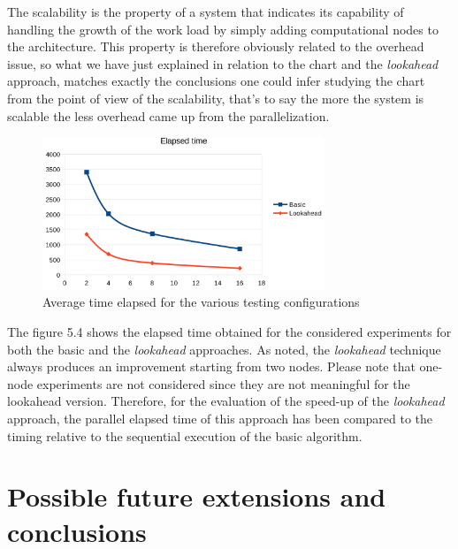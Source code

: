\documentclass[12pt,a4paper,fleqn]{report}
\begin{document}
The scalability is the property of a system that indicates its capability of 
handling the growth of the work load by simply adding computational nodes to the architecture. 
This property is therefore obviously related to the overhead issue, so what we have just 
explained in relation to the chart and the \textit{lookahead} approach, matches exactly the 
conclusions one could infer studying the chart from the point of view of the scalability, that's 
to say the more the system is scalable the less overhead came up from the parallelization.   \\

 \begin{figure}[ht!]
\label{chart1}
\centering
	\vspace{13pt}
    \includegraphics[trim=0mm 10mm 0mm 10mm, width=0.75\textwidth]{time_elapsed}
    \caption{Average time elapsed for the various testing configurations}
\end{figure}

The figure 5.4 shows the elapsed time obtained for the considered experiments for both the basic and the \textit{lookahead} approaches. As noted, the \textit{lookahead} technique always produces an improvement starting from two nodes. Please note that one-node experiments are not considered since they are not meaningful for the lookahead version. Therefore, for the evaluation of the speed-up of the \textit{lookahead} approach, the parallel elapsed time of this approach has been compared to the timing relative to the sequential execution of the basic algorithm.

\newpage
\chapter{Possible future extensions and conclusions}
\end{document}
